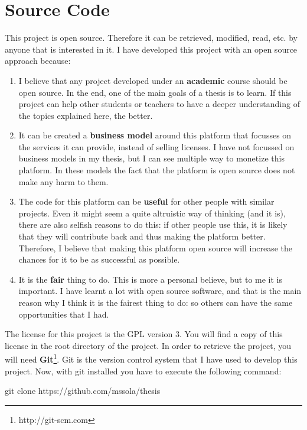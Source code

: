 
\section{Source Code}

This project is open source. Therefore it can be retrieved, modified, read,
etc. by anyone that is interested in it. I have developed this project with an
open source approach because:

\begin{enumerate}
  \itemsep0em
  \item I believe that any project developed under an {\bf academic} course
should be open source. In the end, one of the main goals of a thesis is to
learn. If this project can help other students or teachers to have a deeper
understanding of the topics explained here, the better.
  \item It can be created a {\bf business model} around this platform that
focusses on the services it can provide, instead of selling licenses. I have
not focussed on business models in my thesis, but I can see multiple way to
monetize this platform. In these models the fact that the platform is open
source does not make any harm to them.
  \item The code for this platform can be {\bf useful} for other people with
similar projects. Even it might seem a quite altruistic way of thinking (and it
is), there are also selfish reasons to do this: if other people use this, it is
likely that they will contribute back and thus making the platform better.
Therefore, I believe that making this platform open source will increase the
chances for it to be as successful as possible.
  \item It is the {\bf fair} thing to do. This is more a personal believe, but
to me it is important. I have learnt a lot with open source software, and that
is the main reason why I think it is the fairest thing to do: so others can
have the same opportunities that I had.
\end{enumerate}

The license for this project is the GPL version 3. You will find a copy of this
license in the root directory of the project. In order to retrieve the project,
you will need {\bf Git}\footnote{http://git-scm.com}. Git is the version
control system that I have used to develop this project. Now, with git
installed you have to execute the following command:

\begin{center}
  git clone https://github.com/mssola/thesis
\end{center}

